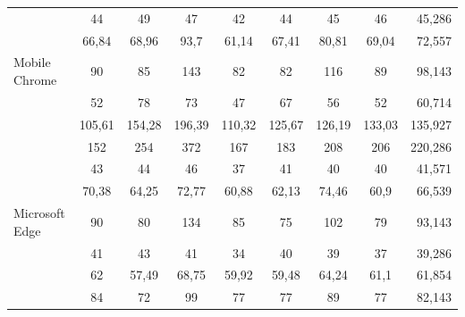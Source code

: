 \documentclass[a4paper, 12pt]{article}
\begin{document}
\begin{table}[h]
{\begin{adjustbox}{angle=0}
{\begin{tabular}{|l|c|c|c|c|c|c|c|r|}
                                                     & 44      & 49                        & 47                        & 42                      & 44      & 45      & 46      & 45,286  \\
                                                     & 66,84   & 68,96                     & 93,7                      & 61,14                   & 67,41   & 80,81   & 69,04   & 72,557  \\
                 \multirow{-3}{*}{Mobile Chrome}     & 90      & 85                        & 143                       & 82                      & 82      & 116     & 89      & 98,143  \\ \hline
\rowcolor{white}                                     & 52      & 78                        & 73                        & 47                      & 67      & 56      & 52      & 60,714  \\
\rowcolor{white}                                     & 105,61  & 154,28                    & 196,39                    & 110,32                  & 125,67  & 126,19  & 133,03  & 135,927 \\
\rowcolor{white} \multirow{-3}{*}{Mobile Safari}     & 152     & 254                       & 372                       & 167                     & 183     & 208     & 206     & 220,286 \\ \hline
                                                     & 43      & 44                        & 46                        & 37                      & 41      & 40      & 40      & 41,571  \\
                                                     & 70,38   & 64,25                     & 72,77                     & 60,88                   & 62,13   & 74,46   & 60,9    & 66,539  \\
                 \multirow{-3}{*}{Microsoft Edge}    & 90      & 80                        & 134                       & 85                      & 75      & 102     & 79      & 93,143  \\ \hline
\rowcolor{white}                                     & 41      & 43                        & 41                        & \cellcolor{green!50}34  & 40      & 39      & 37      & 39,286  \\
\rowcolor{white}                                     & 62      & \cellcolor{green!50}57,49 & 68,75                     & 59,92                   & 59,48   & 64,24   & 61,1    & 61,854  \\
\rowcolor{white} \multirow{-3}{*}{Google Chrome}     & 84      & \cellcolor{green!50}72    & 99                        & 77                      & 77      & 89      & 77      & 82,143  \\ \hline

\end{tabular}}
\end{adjustbox}}
\end{table}
\end{document}
